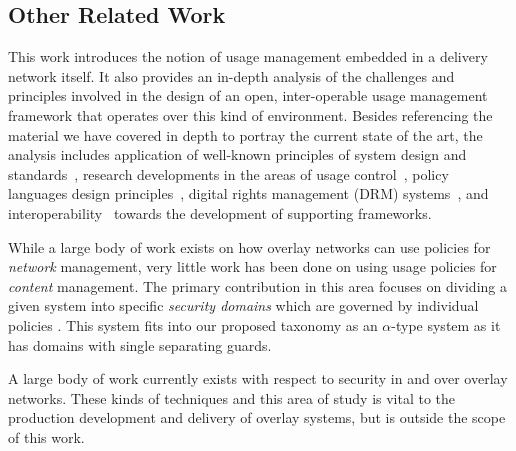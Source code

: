 \subsection{Other Related Work}
This work introduces the notion of usage management embedded in a delivery network itself.  It also provides an in-depth analysis of the challenges and principles involved in the design of an open, inter-operable usage management framework that operates over this kind of environment. Besides referencing the material we have covered in depth to portray the current state of the art, the analysis includes application of well-known principles of system design and standards~\cite{BlCl:01,Cl:88,ClWrSoBr:02}, research developments in the areas of usage control~\cite{PaSa:04,JaHeLa:10}, policy languages design principles~\cite{JaHeMa:06}, digital rights management (DRM) systems~\cite{JaHe:09},  and interoperability~\cite{JaHe:04,HeJa:05,KoLaMaMi:04,coral,marlin} towards the development of supporting frameworks.

While a large body of work exists on how overlay networks can use policies for \textit{network} management, very little work has been done on using usage policies for \textit{content} management.  The primary contribution in this area focuses on dividing a given system into specific \textit{security domains} which are governed by individual policies \cite{4457175}.  This system fits into our proposed taxonomy as an $\alpha$-type system as it has domains with single separating guards.

A large body of work currently exists with respect to security in and over overlay networks.  These kinds of techniques and this area of study is vital to the production development and delivery of overlay systems, but is outside the scope of this work.